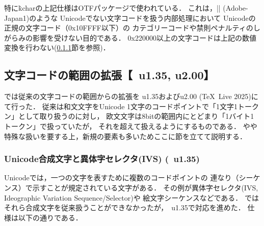 \documentclass[a4paper,11pt,nomag,dvipdfmx]{jsarticle}
\begin{document}
\begin{dangerous}
\begin{itemize}
  \end{itemize}
  特に\.{kchar}の上記仕様はOTFパッケージで使われている．
  これは，|\CID| (Adobe-Japan1)のような
  Unicodeでない文字コードを扱う内部処理において
  Unicodeの正規の文字コード（0x10FFFF以下）の
  カテゴリーコードや禁則ペナルティのしがらみの影響を受けない目的である．
  0x220000以上の文字コードは上記の数値変換を行わない(\ref{sec:uptex_ivs}節を参照)．
\end{dangerous}

\subsection{文字コードの範囲の拡張【\upTeX~u1.35, u2.00】}\label{sec:uptex_extension}
\upTeX では従来の文字コードの範囲からの拡張を
u1.35およびu2.00 (\TeX~Live 2025)にて行った．
従来は和文文字をUnicode 1文字のコードポイントで「1文字1トークン」として取り扱うのに対し，
欧文文字は8bitの範囲内にとどまり「1バイト1トークン」で扱っていたが，
それを超えて扱えるようにするものである．
やや特殊な扱いを要する上，新規の要素も多いためここに節を立てて説明する．

\subsubsection{Unicode合成文字と異体字セレクタ(IVS) (\upTeX~u1.35)}\label{sec:uptex_ivs}
Unicodeでは，一つの文字を表すために複数のコードポイントの
連なり（シーケンス）で示すことが規定されている文字がある．
その例が異体字セレクタ(IVS, Ideographic Variation Sequence/Selector)\cite{ivd220913}や
絵文字シーケンス\cite{emseq160}などである．
\upTeX ではそれら合成文字を従来扱うことができなかったが，\upTeX~u1.35で対応を進めた\cite{tjb46}．
仕様は以下の通りである．
\end{document}
